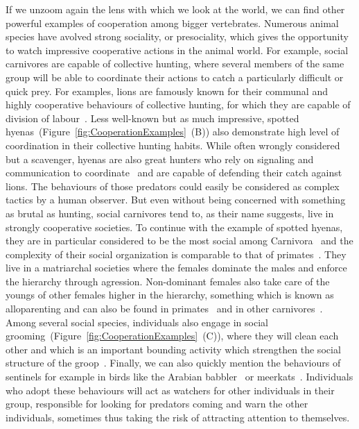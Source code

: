     If we unzoom again the lens with which we look at the world, we can find other powerful examples of cooperation among bigger vertebrates. Numerous animal species have avolved strong sociality, or presociality, which gives the opportunity to watch impressive cooperative actions in the animal world. For example, social carnivores are capable of collective hunting, where several members of the same group will be able to coordinate their actions to catch a particularly difficult or quick prey. For examples, lions are famously known for their communal and highly cooperative behaviours of collective hunting, for which they are capable of division of labour~\parencite{Scheel1991, Stander1992}. Less well-known but as much impressive, spotted hyenas~(Figure~\ref{fig:CooperationExamples}~(B)) also demonstrate high level of coordination in their collective hunting habits. While often wrongly considered but a scavenger, hyenas are also great hunters who rely on signaling and communication to coordinate~\parencite{Drea2009a, Smith2010, Smith2012a} and are capable of defending their catch against lions. The behaviours of those predators could easily be considered as complex tactics by a human observer. But even without being concerned with something as brutal as hunting, social carnivores tend to, as their name suggests, live in strongly cooperative societies. To continue with the example of spotted hyenas, they are in particular considered to be the most social among Carnivora~\parencite{Mills2003} and the complexity of their social organization is comparable to that of primates~\parencite{Drea2003}. They live in a matriarchal societies where the females dominate the males and enforce the hierarchy through agression. Non-dominant females also take care of the youngs of other females higher in the hierarchy, something which is known as alloparenting and can also be found in primates~\parencite{Small1990} and in other carnivores~\parencite{Packer2001}. Among several social species, individuals also engage in social grooming~(Figure~\ref{fig:CooperationExamples}~(C)), where they will clean each other and which is an important bounding activity which strengthen the social structure of the groop~\parencite{Spruijt1992}. Finally, we can also quickly mention the behaviours of sentinels for example in birds like the Arabian babbler~\parencite{Wright2001} or meerkats~\parencite{CluttonBrock1999}. Individuals who adopt these behaviours will act as watchers for other individuals in their group, responsible for looking for predators coming and warn the other individuals, sometimes thus taking the risk of attracting attention to themselves.

